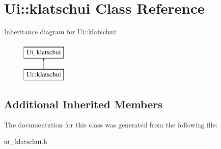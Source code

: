 \hypertarget{class_ui_1_1klatschui}{}\section{Ui\+:\+:klatschui Class Reference}
\label{class_ui_1_1klatschui}
Inheritance diagram for Ui\+:\+:klatschui\+:\begin{figure}[H]
\begin{center}
\leavevmode
\includegraphics[height=2.000000cm]{class_ui_1_1klatschui}
\end{center}
\end{figure}
\subsection*{Additional Inherited Members}


The documentation for this class was generated from the following file\+:\begin{DoxyCompactItemize}
\item 
ui\+\_\+klatschui.\+h\end{DoxyCompactItemize}

